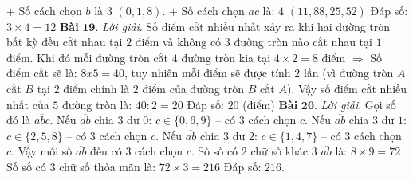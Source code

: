 \begin{multicols}{2}
	\vskip 0.1cm
	+ Số cách chọn $b$ là $3$ $(0,1,8)$.
	\vskip 0.1cm
	+ Số cách chọn $ac$ là: $4$ $(11, 88,25, 52)$
	\vskip 0.1cm
	Đáp số: $3\times 4=12$
	\vskip 0.1cm
	\textbf{\color{cackithi}Bài} $\pmb{19.}$ \textit{Lời giải}. Số điểm cắt nhiều nhất xảy ra khi hai đường tròn bất kỳ đều cắt nhau tại $2$ điểm và không có $3$ đường tròn nào cắt nhau tại $1$ điểm. Khi đó mỗi đường tròn cắt $4$ đường tròn kia tại $4\times 2=8$ điểm $\Rightarrow$ Số điểm cắt sẽ là: $8x5 = 40$, tuy nhiên mỗi điểm sẽ được tính $2$ lần (vì đường tròn $A$ cắt $B$ tại $2$ điểm chính là $2$ điểm của đường tròn $B$ cắt $A$). Vậy số điểm cắt nhiều nhất của $5$ đường tròn là: $40:2 = 20$
	\vskip 0.1cm
	Đáp số: $20$ (điểm)
	\vskip 0.1cm
	\textbf{\color{cackithi}Bài} $\pmb{20.}$ \textit{Lời giải}. 
	Gọi số đó là $\overline{abc}$.
	\vskip 0.1cm
	Nếu $\overline{ab}$ chia $3$ dư $0$: $c\in \{0,6,9\}$ -- có $3$ cách chọn $c$.
	\vskip 0.1cm  
	Nếu $\overline{ab}$ chia $3$ dư $1$: $c\in \{2,5,8\}$ -- có $3$ cách chọn $c$.
	\vskip 0.1cm  
	Nếu $\overline{ab}$ chia $3$ dư $2$: $c\in \{1,4,7\}$ -- có $3$ cách chọn $c$.
	\vskip 0.1cm  
	Vậy mỗi số $\overline{ab}$ đếu có $3$ cách chọn $c$. Số số có $2$ chữ số khác $3$ $\overline{ab}$ là: $8\times9=72$
	\vskip 0.1cm
	Số số có $3$ chữ số thỏa mãn là: $72\times 3=216$
	\vskip 0.1cm
	Đáp số: $216$. 
\end{multicols}
\newpage
\begingroup
{}
